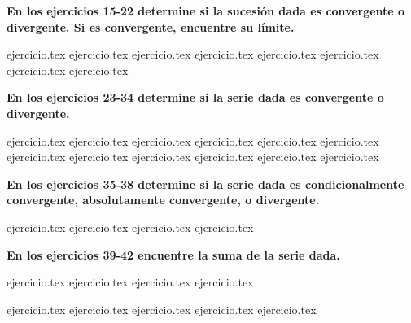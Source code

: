 \vspace{0.3cm}
\noindent\textbf{En los ejercicios 15-22 determine si la sucesión dada es convergente o divergente. Si es convergente, encuentre su límite.}
\begin{enumerate}
    \setcounter{enumi}{14}
    {ejercicio.tex}
{ejercicio.tex}
{ejercicio.tex}
{ejercicio.tex}
{ejercicio.tex}
{ejercicio.tex}
{ejercicio.tex}
{ejercicio.tex}
\end{enumerate}

\vspace{0.3cm}
\noindent\textbf{En los ejercicios 23-34 determine si la serie dada es convergente o divergente.}
\begin{enumerate}
    \setcounter{enumi}{22}
    {ejercicio.tex}
{ejercicio.tex}
{ejercicio.tex}
{ejercicio.tex}
{ejercicio.tex}
{ejercicio.tex}
{ejercicio.tex}
{ejercicio.tex}
{ejercicio.tex}
{ejercicio.tex}
{ejercicio.tex}
{ejercicio.tex}
\end{enumerate}

\vspace{0.3cm}
\noindent\textbf{En los ejercicios 35-38 determine si la serie dada es condicionalmente convergente, absolutamente convergente, o divergente.}
\begin{enumerate}
    \setcounter{enumi}{34}
    {ejercicio.tex}
{ejercicio.tex}
{ejercicio.tex}
{ejercicio.tex}
\end{enumerate}

\vspace{0.3cm}
\noindent\textbf{En los ejercicios 39-42 encuentre la suma de la serie dada.}
\begin{enumerate}
    \setcounter{enumi}{38}
    {ejercicio.tex}
{ejercicio.tex}
{ejercicio.tex}
{ejercicio.tex}
\end{enumerate}

\vspace{0.3cm}
\begin{enumerate}
    \setcounter{enumi}{42}
    {ejercicio.tex}
{ejercicio.tex}
{ejercicio.tex}
{ejercicio.tex}
{ejercicio.tex}
\end{enumerate}

